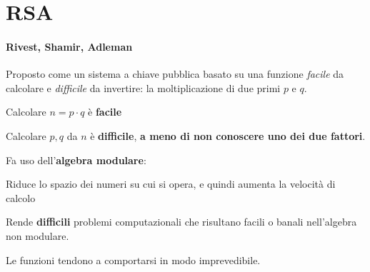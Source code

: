 \documentclass[10pt]{book}
\begin{document}
\section{RSA} \paragraph{Rivest, Shamir, Adleman} Proposto come un sistema a chiave pubblica basato su una funzione \textit{facile} da calcolare e \textit{difficile} da invertire: la moltiplicazione di due primi $p$ e $q$.
\begin{list}{}{}
	\item Calcolare $n = p\cdot q$ è \textbf{facile}
	\item Calcolare $p,q$ da $n$ è \textbf{difficile}, \textbf{a meno di non conoscere uno dei due fattori}.
\end{list}
Fa uso dell'\textbf{algebra modulare}:
\begin{list}{}{}
	\item Riduce lo spazio dei numeri su cui si opera, e quindi aumenta la velocità di calcolo
	\item Rende \textbf{difficili} problemi computazionali che risultano facili o banali nell'algebra non modulare.
\end{list}
Le funzioni tendono a comportarsi in modo imprevedibile.
\end{document}
